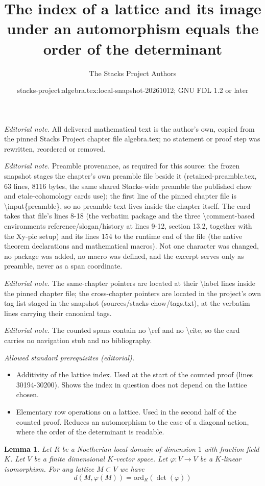 \documentclass[10pt,a4paper]{amsart}
\title{The index of a lattice and its image under an automorphism equals the order of the determinant}
\author{The Stacks Project Authors}
\date{stacks-project:algebra.tex:local-snapshot-20261012; GNU FDL 1.2 or later}
\theoremstyle{plain}
\newtheorem{lemma}[subsection]{Lemma}
\theoremstyle{definition}
\theoremstyle{remark}
\numberwithin{equation}{subsection}
\begin{document}
\maketitle
\noindent\textit{Editorial note.} All delivered mathematical text is the author's own, copied from the pinned Stacks Project chapter file algebra.tex; no statement or proof step was rewritten, reordered or removed.\par\medskip
\noindent\textit{Editorial note.} Preamble provenance, as required for this source: the frozen snapshot stages the chapter's own preamble file beside it (retained-preamble.tex, 63 lines, 8116 bytes, the same shared Stacks-wide preamble the published chow and etale-cohomology cards use); the first line of the pinned chapter file is \textbackslash{}input\{preamble\}, so no preamble text lives inside the chapter itself. The card takes that file's lines 8-18 (the verbatim package and the three \textbackslash{}comment-based environments reference/slogan/history at lines 9-12, section 13.2, together with the Xy-pic setup) and its lines 154 to the runtime end of the file (the native theorem declarations and mathematical macros). Not one character was changed, no package was added, no macro was defined, and the excerpt serves only as preamble, never as a span coordinate.\par\medskip
\noindent\textit{Editorial note.} The same-chapter pointers are located at their \textbackslash{}label lines inside the pinned chapter file; the cross-chapter pointers are located in the project's own tag list staged in the snapshot (sources/stacks-chow/tags.txt), at the verbatim lines carrying their canonical tags.\par\medskip
\noindent\textit{Editorial note.} The counted spans contain no \textbackslash{}ref and no \textbackslash{}cite, so the card carries no navigation stub and no bibliography.\par\medskip
\noindent\textit{Allowed standard prerequisites (editorial).}\begin{itemize}
\item Additivity of the lattice index. Used at the start of the counted proof (lines 30194-30200). Shows the index in question does not depend on the lattice chosen.
\item Elementary row operations on a lattice. Used in the second half of the counted proof. Reduces an automorphism to the case of a diagonal action, where the order of the determinant is readable.
\end{itemize}\medskip
\begin{lemma}
\label{lemma-order-vanishing-determinant}
Let $R$ be a Noetherian local domain of dimension $1$ with
fraction field $K$. Let $V$ be a finite dimensional $K$-vector space.
Let $\varphi : V \to V$ be a $K$-linear isomorphism.
For any lattice $M \subset V$ we have
$$
d(M, \varphi(M)) = \text{ord}_R(\det(\varphi))
$$
\end{lemma}
\end{document}
